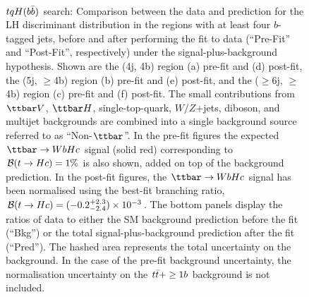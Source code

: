 \begin{figure}[htbp]
\begin{center}
 \\
\caption{\small{$tqH(b\bar{b})$ search: Comparison between the data and prediction for the LH discriminant distribution in the regions with at least four $b$-tagged jets,
before and after performing the fit to data  (``Pre-Fit'' and ``Post-Fit'', respectively) under the signal-plus-background hypothesis.
Shown are the (4j, 4b) region (a) pre-fit and (d) post-fit,  the (5j, $\geq$4b) region (b) pre-fit and (e) post-fit, and
the ($\geq$6j, $\geq$4b) region (c) pre-fit and (f) post-fit.
The small contributions from $\ttbar V$, $\ttbar H$, single-top-quark, $W/Z$+jets, diboson, and multijet backgrounds are combined into a single background source 
referred to as ``Non-$\ttbar$''. 
In the pre-fit figures the expected $\Hc$ signal (solid red) corresponding to $\mathcal{B}(t\to Hc)=1\%$ is also shown,
added on top of the background prediction. In the post-fit figures, the $\Hc$ signal has been normalised using the best-fit branching ratio, 
$\mathcal{B}(t\to Hc)=(-0.2^{+2.3}_{-2.4}) \times 10^{-3}$.
The bottom panels display the ratios of data to either the SM background prediction before the fit (``Bkg'')  or the total signal-plus-background
prediction after the fit (``Pred''). 
The hashed area represents the total uncertainty on the background.
In the case of the pre-fit background uncertainty, the normalisation uncertainty on the $t\bar{t}+\geq1b$ background is not included. }}
\label{fig:prepostfit_unblinded_WbHc_4btagin}
\end{center}
\end{figure}

